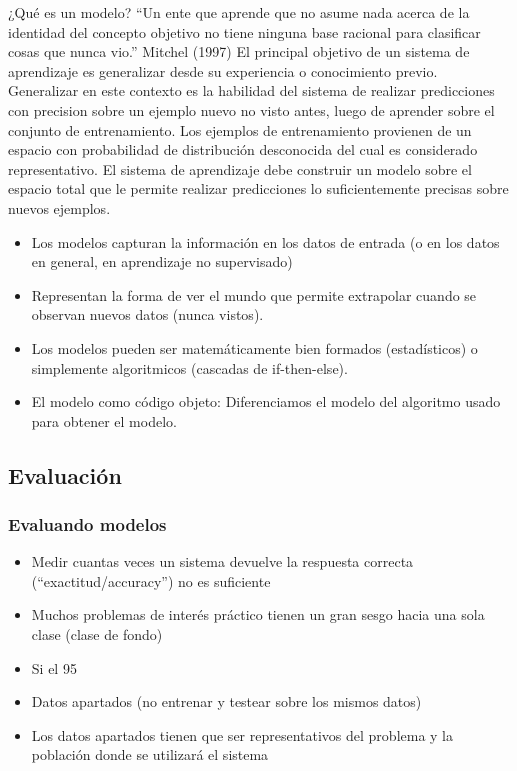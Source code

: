 \documentclass[a4paper,12pt,spanish]{book}
\begin{document}
	¿Qué es un modelo?
	“Un ente que aprende que no asume nada acerca de la identidad del concepto objetivo no tiene ninguna base racional para clasificar cosas que nunca vio.”
	Mitchel (1997)
	El principal objetivo de un sistema de aprendizaje es generalizar desde su experiencia o conocimiento previo. Generalizar en este contexto es la habilidad del sistema de realizar
	predicciones con precision sobre un ejemplo nuevo no visto antes, luego de aprender sobre el conjunto de entrenamiento. Los ejemplos de entrenamiento provienen de un espacio 
	con probabilidad de distribución desconocida del cual es considerado representativo. El sistema de aprendizaje debe construir un modelo sobre el espacio total que le permite realizar
	predicciones lo suficientemente precisas sobre nuevos ejemplos.
	\begin{itemize}
	  \item Los modelos capturan la información en los datos de entrada (o en los datos en general, en aprendizaje no supervisado)
	  \item Representan la forma de ver el mundo que permite extrapolar cuando se observan nuevos datos (nunca vistos).
	  \item Los modelos pueden ser matemáticamente bien formados (estadísticos) o simplemente algoritmicos (cascadas de if-then-else).
	  \item El modelo como código objeto: Diferenciamos el modelo del algoritmo usado para obtener el modelo.
	\end{itemize}

      \subsection{Evaluación}

	\subsubsection {Evaluando modelos}
	  \begin{itemize}
	    \item Medir cuantas veces un sistema devuelve la respuesta correcta (“exactitud/accuracy”) no es suficiente
	    \item Muchos problemas de interés práctico tienen un gran sesgo hacia una sola clase (clase de fondo)
	    \item Si el 95%
	    \item Datos apartados (no entrenar y testear sobre los mismos datos)
	    \item Los datos apartados tienen que ser representativos del problema y la población donde se utilizará el sistema
	  \end{itemize}
\end{document}
